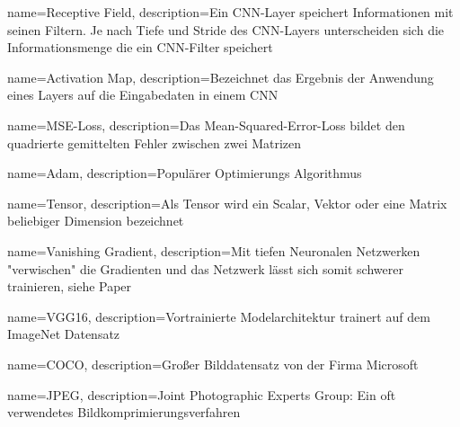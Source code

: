 {
	name={Receptive Field},
	description={Ein CNN-Layer speichert Informationen mit seinen Filtern. Je nach Tiefe und Stride des CNN-Layers unterscheiden sich die Informationsmenge die ein CNN-Filter speichert}
}

{
	name={Activation Map},
	description={Bezeichnet das Ergebnis der Anwendung eines Layers auf die Eingabedaten in einem CNN}
}

{
	name={MSE-Loss},
	description={Das Mean-Squared-Error-Loss bildet den quadrierte gemittelten Fehler zwischen zwei Matrizen}
}

{
	name={Adam},
	description={Populärer Optimierungs Algorithmus \cite{kingma2015adam}}
}


{
	name={Tensor},
	description={Als Tensor wird ein Scalar, Vektor oder eine Matrix beliebiger Dimension bezeichnet}
}

{
	name={Vanishing Gradient},
	description={Mit tiefen Neuronalen Netzwerken "verwischen" die Gradienten und das Netzwerk lässt sich somit schwerer trainieren, siehe Paper \cite{DBLP:journals/corr/HeZRS15}}
}

{
	name={VGG16},
	description={Vortrainierte Modelarchitektur trainert auf dem ImageNet Datensatz}
}

{
	name={COCO},
	description={Großer Bilddatensatz von der Firma Microsoft \cite{DBLP:journals/corr/LinMBHPRDZ14}}
}

{
	name={JPEG},
	description={Joint Photographic Experts Group: Ein oft verwendetes Bildkomprimierungsverfahren}
}